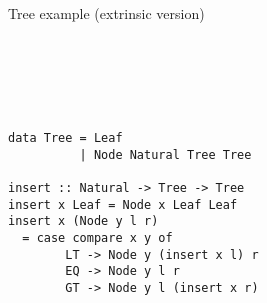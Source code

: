 \documentclass[aspectratio=169]{beamer}
\begin{document}
\begin{frame}[fragile]{Tree example (extrinsic version)}
\begin{minipage}{.53\textwidth}
\begin{code}
\\
\>[4][@{}l@{\AgdaIndent{0}}]%
\>[6]\AgdaSymbol{(}\AgdaSpace{}%
\AgdaSymbol{\AgdaUnderscore{})}\AgdaSpace{}%
\AgdaSpace{}%
\AgdaSpace{}%
\AgdaSpace{}%
\AgdaSymbol{(}\AgdaSpace{}%
\AgdaSpace{}%
\AgdaSymbol{)}\AgdaSpace{}%
\<%
\\
%
\>[6]\AgdaSymbol{(}\AgdaSpace{}%
\AgdaSymbol{\AgdaUnderscore{})}\AgdaSpace{}%
\AgdaSpace{}%
\AgdaSpace{}%
\AgdaSpace{}%
\AgdaSpace{}%
\<%
\\
%
\>[6]\AgdaSymbol{(}\AgdaSpace{}%
\AgdaSymbol{\AgdaUnderscore{})}\AgdaSpace{}%
\AgdaSpace{}%
\AgdaSpace{}%
\AgdaSpace{}%
\AgdaSpace{}%
\AgdaSymbol{(}\AgdaSpace{}%
\AgdaSpace{}%
\AgdaSymbol{)}\<%
\\
%
\>[2]\AgdaSymbol{\{-\#}\AgdaSpace{}%
\AgdaSpace{}%
\AgdaSpace{}%
\AgdaSpace{}%
\AgdaSymbol{\#-\}}\<%
\end{code}
\end{minipage}\hspace{-1cm}\vrule\hspace{.5cm}
\begin{minipage}{.45\textwidth}%
\begin{verbatim}
data Tree = Leaf
          | Node Natural Tree Tree

insert :: Natural -> Tree -> Tree
insert x Leaf = Node x Leaf Leaf
insert x (Node y l r)
  = case compare x y of
        LT -> Node y (insert x l) r
        EQ -> Node y l r
        GT -> Node y l (insert x r)
\end{verbatim}
\end{minipage}

\end{frame}
\end{document}
